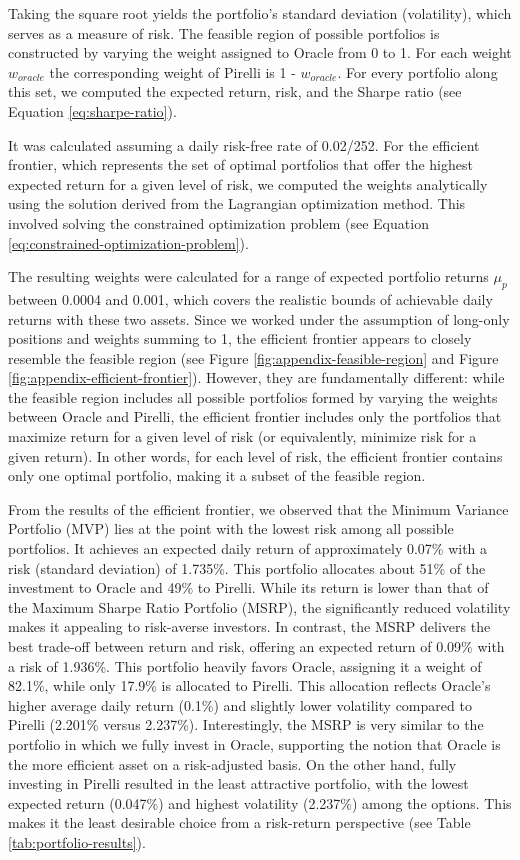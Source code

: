 \documentclass[12pt,a4paper]{report}
\begin{document}
Taking the square root yields the portfolio's standard deviation (volatility), which serves as a measure of risk. The feasible region of possible portfolios is constructed by varying the weight assigned to Oracle from 0 to 1. For each weight $w_{oracle}$ the corresponding weight of Pirelli is 1 - $w_{oracle}$. For every portfolio along this set, we computed the expected return, risk, and the Sharpe ratio (see Equation \ref{eq:sharpe-ratio}).

It was calculated assuming a daily risk-free rate of 0.02/252. For the efficient frontier, which represents the set of optimal portfolios that offer the highest expected return for a given level of risk, we computed the weights analytically using the solution derived from the Lagrangian optimization method. This involved solving the constrained optimization problem (see Equation \ref{eq:constrained-optimization-problem}).

The resulting weights were calculated for a range of expected portfolio returns $\mu_p$ between 0.0004 and 0.001, which covers the realistic bounds of achievable daily returns with these two assets. Since we worked under the assumption of long-only positions and weights summing to 1, the efficient frontier appears to closely resemble the feasible region (see Figure \ref{fig:appendix-feasible-region} and Figure \ref{fig:appendix-efficient-frontier}). However, they are fundamentally different: while the feasible region includes all possible portfolios formed by varying the weights between Oracle and Pirelli, the efficient frontier includes only the portfolios that maximize return for a given level of risk (or equivalently, minimize risk for a given return). In other words, for each level of risk, the efficient frontier contains only one optimal portfolio, making it a subset of the feasible region.

From the results of the efficient frontier, we observed that the Minimum Variance Portfolio (MVP) lies at the point with the lowest risk among all possible portfolios. It achieves an expected daily return of approximately 0.07\% with a risk (standard deviation) of 1.735\%. This portfolio allocates about 51\% of the investment to Oracle and 49\% to Pirelli. While its return is lower than that of the Maximum Sharpe Ratio Portfolio (MSRP), the significantly reduced volatility makes it appealing to risk-averse investors. In contrast, the MSRP delivers the best trade-off between return and risk, offering an expected return of 0.09\% with a risk of 1.936\%. This portfolio heavily favors Oracle, assigning it a weight of 82.1\%, while only 17.9\% is allocated to Pirelli. This allocation reflects Oracle’s higher average daily return (0.1\%) and slightly lower volatility compared to Pirelli (2.201\% versus 2.237\%). Interestingly, the MSRP is very similar to the portfolio in which we fully invest in Oracle, supporting the notion that Oracle is the more efficient asset on a risk-adjusted basis. On the other hand, fully investing in Pirelli resulted in the least attractive portfolio, with the lowest expected return (0.047\%) and highest volatility (2.237\%) among the options. This makes it the least desirable choice from a risk-return perspective (see Table \ref{tab:portfolio-results}).
\end{document}
